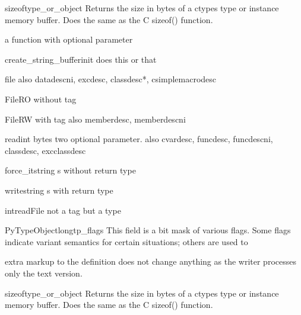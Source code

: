 \begin{funcdesc}{sizeof}{type_or_object}
Returns the size in bytes of a ctypes type or instance memory
buffer.  Does the same as the C sizeof() function.
\end{funcdesc}

a function with optional parameter

\begin{funcdesc}{create_string_buffer}{init}
does this or that
\end{funcdesc}

\begin{datadesc}{file}
also datadescni, excdesc, classdesc*, csimplemacrodesc
\end{datadesc}

\begin{ctypedesc}{FileRO}
without tag
\end{ctypedesc}

\begin{ctypedesc}[ftag]{FileRW}
with tag
also memberdesc, memberdescni
\end{ctypedesc}

\begin{funcdescni}{read}{int bytes }
two optional parameter.
also cvardesc, funcdesc, funcdescni, classdesc, excclassdesc
\end{funcdescni}

\begin{methoddesc}{force_it}{string s}
without return type
\end{methoddesc}

\begin{methoddescni}[bool]{write}{string s}
with return type
\end{methoddescni}

\begin{cfuncdesc}{int}{read}{File}
not a tag but a type
\end{cfuncdesc}

\begin{cmemberdesc}{PyTypeObject}{long}{tp_flags}
This field is a bit mask of various flags. Some flags indicate
variant semantics for certain situations; others are used to
\end{cmemberdesc}

extra markup to the definition does not change anything as the writer processes
only the text version.

\begin{funcdesc}{sizeof}{type_or_object}
Returns the size in bytes of a ctypes type or instance memory
buffer.  Does the same as the C sizeof() function.
\end{funcdesc}

